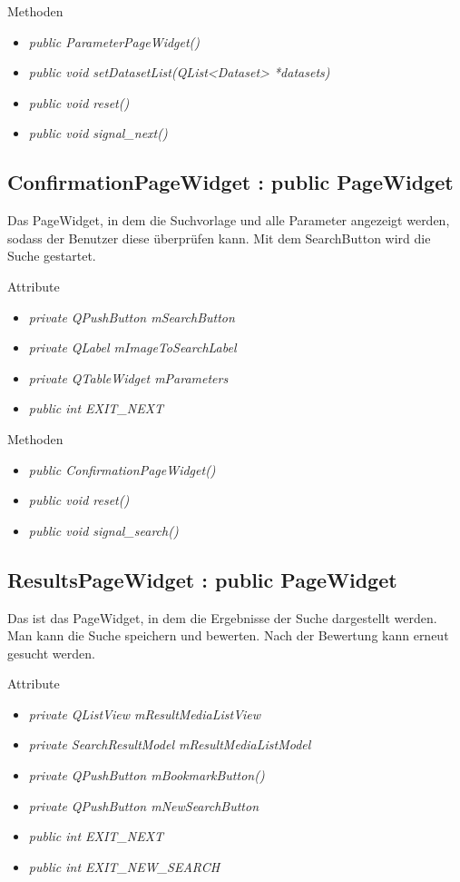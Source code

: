 Methoden
\begin{itemize}
	\item\textit{public ParameterPageWidget()}
	\item\textit{public void setDatasetList(QList<Dataset> *datasets)}
	\item\textit{public void reset()}
	\item\textit{public void signal\_next()}
\end{itemize}

\subsection*{ConfirmationPageWidget : public PageWidget}
Das PageWidget, in dem die Suchvorlage und alle Parameter angezeigt werden, sodass der Benutzer diese überprüfen kann. Mit dem SearchButton wird die Suche gestartet.

Attribute
\begin{itemize}
	\item\textit{private QPushButton mSearchButton}
	\item\textit{private QLabel mImageToSearchLabel}
	\item\textit{private QTableWidget mParameters}
	\item\textit{public int EXIT\_NEXT}     
\end{itemize}

Methoden
\begin{itemize}
	\item\textit{public ConfirmationPageWidget()}
	\item\textit{public void reset()}
	\item\textit{public void signal\_search()}
\end{itemize}

\subsection*{ResultsPageWidget : public PageWidget}
Das ist das PageWidget, in dem die Ergebnisse der Suche dargestellt werden. Man kann die Suche speichern und bewerten. Nach der Bewertung kann erneut gesucht werden.

Attribute
\begin{itemize}
	\item\textit{private QListView mResultMediaListView}
	\item\textit{private SearchResultModel mResultMediaListModel}
	\item\textit{private QPushButton mBookmarkButton()}
	\item\textit{private QPushButton mNewSearchButton}
	\item\textit{public int EXIT\_NEXT}  
	\item\textit{public int EXIT\_NEW\_SEARCH}  
\end{itemize}

